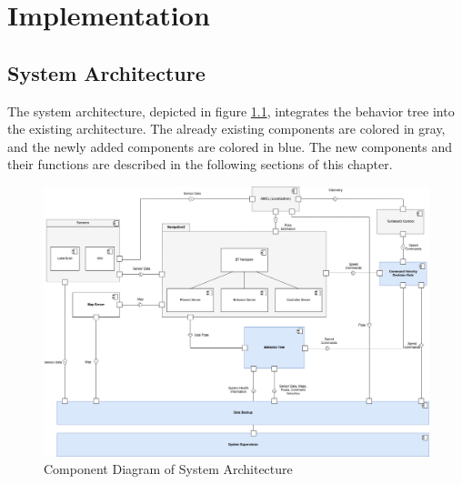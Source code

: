 \chapter{Implementation}
\label{cha:implementierung}

\section{System Architecture}

The system architecture, depicted in figure \ref{fig:component_diagram}, integrates the behavior tree into the existing architecture. 
The already existing components are colored in gray, and the newly added components are colored in blue.
The new components and their functions are described in the following sections of this chapter.  


\begin{figure}[ht]
	\includegraphics[width=1.00\textwidth]{images/component_diagram_bt.png}
	\caption{Component Diagram of System Architecture}
	\label{fig:component_diagram}
\end{figure}

